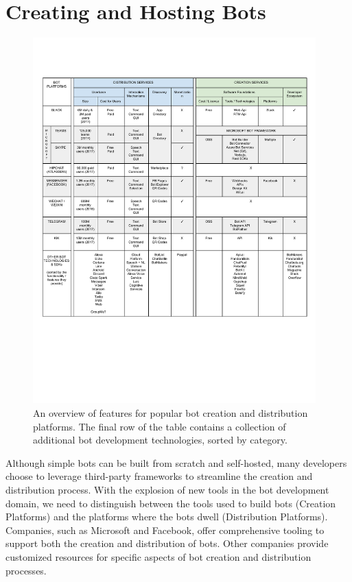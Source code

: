 \documentclass{sig-alternate}
\begin{document}
\section{Creating and Hosting Bots}

	\begin{figure}[ht]
	  \includegraphics[width=\textwidth,height=400pt]{PlatformComparisonTable.pdf}
	  \caption{An overview of features for popular bot creation and distribution platforms. The final row of the table contains a collection of additional bot development technologies, sorted by category.}
	\end{figure}

	Although simple bots can be built from scratch and self-hosted, many developers choose to leverage third-party frameworks to streamline the creation and distribution process. With the explosion of new tools in the bot development domain, we need to distinguish between the tools used to build bots (Creation Platforms) and the platforms where the bots dwell (Distribution Platforms).
	Companies, such as Microsoft and Facebook, offer comprehensive tooling to support both the creation and distribution of bots. Other companies provide customized resources for specific aspects of bot creation and distribution processes. 
\end{document}
